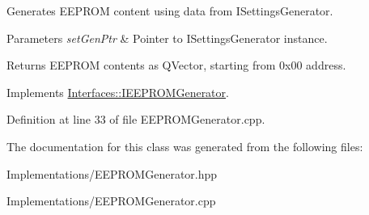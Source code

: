 Generates E\+E\+P\+R\+OM content using data from I\+Settings\+Generator. 


\begin{DoxyParams}{Parameters}
{\em set\+Gen\+Ptr} & Pointer to I\+Settings\+Generator instance. \\
\hline
\end{DoxyParams}
\begin{DoxyReturn}{Returns}
E\+E\+P\+R\+OM contents as Q\+Vector, starting from 0x00 address. 
\end{DoxyReturn}


Implements \hyperlink{class_interfaces_1_1_i_e_e_p_r_o_m_generator_a9d248220e0f557cf6c6b450ed84281dd}{Interfaces\+::\+I\+E\+E\+P\+R\+O\+M\+Generator}.



Definition at line 33 of file E\+E\+P\+R\+O\+M\+Generator.\+cpp.



The documentation for this class was generated from the following files\+:\begin{DoxyCompactItemize}
\item 
Implementations/E\+E\+P\+R\+O\+M\+Generator.\+hpp\item 
Implementations/E\+E\+P\+R\+O\+M\+Generator.\+cpp\end{DoxyCompactItemize}
